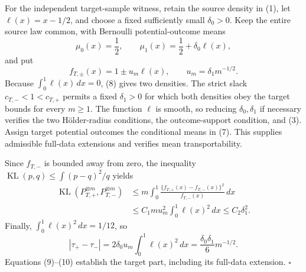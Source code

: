 For the independent target-sample witness, retain the source density in (1), let \(\ell(x)=x-1/2\), and choose a fixed sufficiently small \(\delta_0>0\).  Keep the entire source law common, with Bernoulli potential-outcome means
\[
\mu_0(x)=\frac12,
\qquad
\mu_1(x)=\frac12+\delta_0\ell(x),
\tag{7}
\]
and put
\[
f_{T,\pm}(x)=1\pm u_m\ell(x),
\qquad
u_m=\delta_1m^{-1/2}.
\tag{8}
\]
Because \(\int_0^1\ell(x)\,dx=0\), (8) gives two densities.  The strict slack \(c_{T,-}<1<c_{T,+}\) permits a fixed \(\delta_1>0\) for which both densities obey the target bounds for every \(m\ge1\).  The function \(\ell\) is smooth, so reducing \(\delta_0,\delta_1\) if necessary verifies the two Hölder-radius conditions, the outcome-support condition, and (3).  Assign target potential outcomes the conditional means in (7).  This supplies admissible full-data extensions and verifies mean transportability.

Since \(f_{T,-}\) is bounded away from zero, the inequality \(\operatorname{KL}(p,q)\le\int(p-q)^2/q\) yields
\[
\begin{aligned}
\operatorname{KL}(P_{T,+}^{\otimes m},P_{T,-}^{\otimes m})
&\le m\int_0^1
 \frac{\{f_{T,+}(x)-f_{T,-}(x)\}^2}{f_{T,-}(x)}\,dx\\
&\le C_1mu_m^2\int_0^1\ell(x)^2\,dx
\le C_2\delta_1^2.
\end{aligned}
\tag{9}
\]
Finally, \(\int_0^1\ell(x)^2\,dx=1/12\), so
\[
|\tau_+-\tau_-|
=2\delta_0u_m\int_0^1\ell(x)^2\,dx
=\frac{\delta_0\delta_1}{6}m^{-1/2}.
\tag{10}
\]
Equations (9)--(10) establish the target part, including its full-data extension. \(\square\)